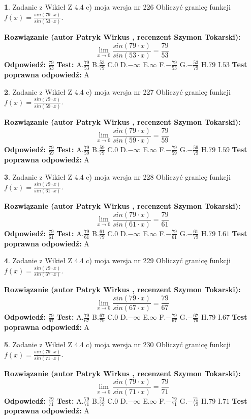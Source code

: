 \documentclass[12pt, a4paper]{article}
\theoremstyle{definition} %
\newtheorem{zad}{}
\newcommand{\zadStart}[1]{\begin{zad}#1\newline}
\newcommand{\zadStop}{\end{zad}}
\newcommand{\rozwStart}[2]{\noindent \textbf{Rozwiązanie (autor #1 , recenzent #2): }\newline}
\newcommand{\rozwStop}{\newline}
\newcommand{\odpStart}{\noindent \textbf{Odpowiedź:}\newline}
\newcommand{\odpStop}{\newline}
\newcommand{\testStart}{\noindent \textbf{Test:}\newline}
\newcommand{\testStop}{\newline}
\newcommand{\kluczStart}{\noindent \textbf{Test poprawna odpowiedź:}\newline}
\newcommand{\kluczStop}{\newline}
\begin{document}
\zadStart{Zadanie z Wikieł Z 4.4 c) moja wersja nr 226}
Obliczyć granicę funkcji $f(x)=\frac{sin(79\cdot x)}{sin(53\cdot x)}$.
\zadStop
\rozwStart{Patryk Wirkus}{Szymon Tokarski}
$$\lim\limits_{x\to 0}\frac{sin(79\cdot x)}{sin(53\cdot x)}=
\frac{79}{53}$$
\rozwStop
\odpStart
$\frac{79}{53}$
\odpStop
\testStart
A.$\frac{79}{53}$
B.$\frac{53}{79}$
C.$0$
D.$-\infty$
E.$\infty$
F.$-\frac{79}{53}$
G.$-\frac{53}{79}$
H.$79$
I.$53$
\testStop
\kluczStart
A
\kluczStop



\zadStart{Zadanie z Wikieł Z 4.4 c) moja wersja nr 227}
Obliczyć granicę funkcji $f(x)=\frac{sin(79\cdot x)}{sin(59\cdot x)}$.
\zadStop
\rozwStart{Patryk Wirkus}{Szymon Tokarski}
$$\lim\limits_{x\to 0}\frac{sin(79\cdot x)}{sin(59\cdot x)}=
\frac{79}{59}$$
\rozwStop
\odpStart
$\frac{79}{59}$
\odpStop
\testStart
A.$\frac{79}{59}$
B.$\frac{59}{79}$
C.$0$
D.$-\infty$
E.$\infty$
F.$-\frac{79}{59}$
G.$-\frac{59}{79}$
H.$79$
I.$59$
\testStop
\kluczStart
A
\kluczStop



\zadStart{Zadanie z Wikieł Z 4.4 c) moja wersja nr 228}
Obliczyć granicę funkcji $f(x)=\frac{sin(79\cdot x)}{sin(61\cdot x)}$.
\zadStop
\rozwStart{Patryk Wirkus}{Szymon Tokarski}
$$\lim\limits_{x\to 0}\frac{sin(79\cdot x)}{sin(61\cdot x)}=
\frac{79}{61}$$
\rozwStop
\odpStart
$\frac{79}{61}$
\odpStop
\testStart
A.$\frac{79}{61}$
B.$\frac{61}{79}$
C.$0$
D.$-\infty$
E.$\infty$
F.$-\frac{79}{61}$
G.$-\frac{61}{79}$
H.$79$
I.$61$
\testStop
\kluczStart
A
\kluczStop



\zadStart{Zadanie z Wikieł Z 4.4 c) moja wersja nr 229}
Obliczyć granicę funkcji $f(x)=\frac{sin(79\cdot x)}{sin(67\cdot x)}$.
\zadStop
\rozwStart{Patryk Wirkus}{Szymon Tokarski}
$$\lim\limits_{x\to 0}\frac{sin(79\cdot x)}{sin(67\cdot x)}=
\frac{79}{67}$$
\rozwStop
\odpStart
$\frac{79}{67}$
\odpStop
\testStart
A.$\frac{79}{67}$
B.$\frac{67}{79}$
C.$0$
D.$-\infty$
E.$\infty$
F.$-\frac{79}{67}$
G.$-\frac{67}{79}$
H.$79$
I.$67$
\testStop
\kluczStart
A
\kluczStop



\zadStart{Zadanie z Wikieł Z 4.4 c) moja wersja nr 230}
Obliczyć granicę funkcji $f(x)=\frac{sin(79\cdot x)}{sin(71\cdot x)}$.
\zadStop
\rozwStart{Patryk Wirkus}{Szymon Tokarski}
$$\lim\limits_{x\to 0}\frac{sin(79\cdot x)}{sin(71\cdot x)}=
\frac{79}{71}$$
\rozwStop
\odpStart
$\frac{79}{71}$
\odpStop
\testStart
A.$\frac{79}{71}$
B.$\frac{71}{79}$
C.$0$
D.$-\infty$
E.$\infty$
F.$-\frac{79}{71}$
G.$-\frac{71}{79}$
H.$79$
I.$71$
\testStop
\kluczStart
A
\kluczStop
\end{document}

